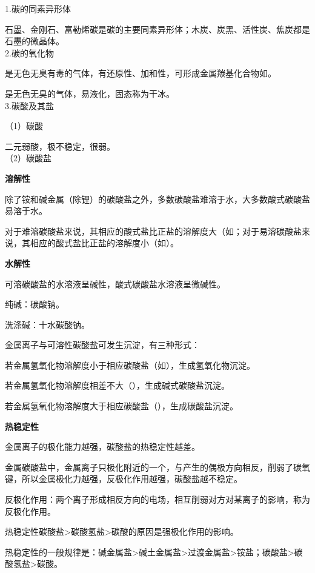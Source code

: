 \documentclass[a4paper,UTF8]{article}
\begin{document}
1.碳的同素异形体

石墨、金刚石、富勒烯碳是碳的主要同素异形体；木炭、炭黑、活性炭、焦炭都是石墨的微晶体。\\

2.碳的氧化物

是无色无臭有毒的气体，有还原性、加和性，可形成金属羰基化合物如\ce{[Ni(CO)4]}。

是无色无臭的气体，易液化，固态称为干冰。\\

3.碳酸及其盐

（1）碳酸

二元弱酸，极不稳定，很弱。\\

（2）碳酸盐

\textbf{溶解性}

除了铵和碱金属（除锂）的碳酸盐之外，多数碳酸盐难溶于水，大多数酸式碳酸盐易溶于水。

对于难溶碳酸盐来说，其相应的酸式盐比正盐的溶解度大（如；对于易溶碳酸盐来说，其相应的酸式盐比正盐的溶解度小（如）。

\textbf{水解性}

可溶碳酸盐的水溶液呈碱性，酸式碳酸盐水溶液呈微碱性。

纯碱：碳酸钠。

洗涤碱：十水碳酸钠。

金属离子与可溶性碳酸盐可发生沉淀，有三种形式：

若金属氢氧化物溶解度小于相应碳酸盐（如），生成氢氧化物沉淀。

若金属氢氧化物溶解度相差不大（），生成碱式碳酸盐沉淀。

若金属氢氧化物溶解度大于相应碳酸盐（），生成碳酸盐沉淀。

\textbf{热稳定性}

金属离子的极化能力越强，碳酸盐的热稳定性越差。


金属碳酸盐中，金属离子只极化附近的一个，与产生的偶极方向相反，削弱了碳氧键，所以金属极化力越强，反极化作用越强，碳酸盐越不稳定。

反极化作用：两个离子形成相反方向的电场，相互削弱对方对某离子的影响，称为反极化作用。

热稳定性碳酸盐>碳酸氢盐>碳酸的原因是强极化作用的影响。

热稳定性的一般规律是：碱金属盐>碱土金属盐>过渡金属盐>铵盐；碳酸盐>碳酸氢盐>碳酸。
\end{document}
